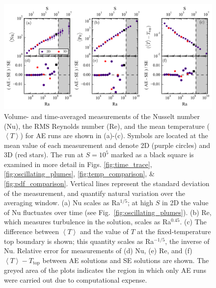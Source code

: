 \documentclass[aps, pre, onecolumn, nofootinbib, notitlepage, groupedaddress, amsfonts, amssymb, amsmath, longbibliography]{revtex4-1}
\newcommand{\angles}[1]{\ensuremath{\left\langle #1 \right\rangle}}
\begin{document}
\begin{figure}[t!]
\includegraphics[width=\textwidth]{./figs/parameter_space_comparison.png}
\caption{Volume- and time-averaged measurements of the Nusselt number (Nu), the
RMS Reynolds number (Re), and the mean temperature ($\angles{T}$) for AE runs are shown in (a)-(c).
Symbols are located at the mean value of
each measurement and denote 2D (purple circles) and 3D (red stars). 
The run at $S = 10^5$ marked as a
black square is examined in more detail in Figs. \ref{fig:time_trace}, \ref{fig:oscillating_plumes},
\ref{fig:temp_comparison}, \& \ref{fig:pdf_comparison}.
Vertical lines represent the standard deviation of the measurement,
and quantify natural variation over the averaging window. 
(a) Nu scales as Ra$^{1/5}$; at high $S$ in 2D the value of Nu fluctuates over time
(see Fig.~\ref{fig:oscillating_plumes}).  
(b) Re, which measures turbulence in the solution, scales as
Ra$^{0.45}$. (c) The difference between $\angles{T}$ and the value of $T$ at the fixed-temperature
top boundary is shown; this quantity scales as Ra$^{-1/5}$, the inverse of Nu.
Relative error for measurements of (d) Nu, (e) Re, and (f) $\angles{T} - T_{\text{top}}$ between 
AE solutions and SE solutions are shown.
The greyed area of the plots indicates the region in which only AE runs were
carried out due to computational expense. \label{fig:parameter_space_comparison} }
\end{figure}
\end{document}
